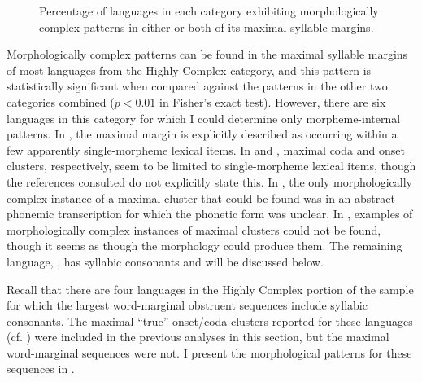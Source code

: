 \begin{figure}  
\caption{\label{fig:3.7} Percentage of languages in each category exhibiting morphologically complex patterns in either or both of its maximal syllable margins.}
\end{figure}

  Morphologically complex patterns can be found in the maximal syllable margins of most languages from the Highly Complex category, and this pattern is statistically significant when compared against the patterns in the other two categories combined ($p < 0.01$ in Fisher’s exact test). However, there are six languages in this category for which I could determine only morpheme-internal patterns. In , the maximal margin is explicitly described as occurring within a few apparently single-morpheme lexical items. In  and , maximal coda and onset clusters, respectively, seem to be limited to single-morpheme lexical items, though the references consulted do not explicitly state this. In , the only morphologically complex instance of a maximal cluster that could be found was in an abstract phonemic transcription for which the phonetic form was unclear. In , examples of morphologically complex instances of maximal clusters could not be found, though it seems as though the morphology could produce them. The remaining language, , has syllabic consonants and will be discussed below.

  Recall that there are four languages in the Highly Complex portion of the sample for which the largest word-marginal obstruent sequences include syllabic consonants. The maximal ``true'' onset/coda clusters reported for these languages (cf. ) were included in the previous analyses in this section, but the maximal word-marginal sequences were not. I present the morphological patterns for these sequences in .

